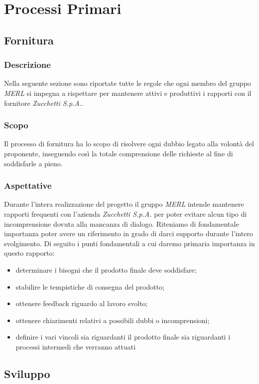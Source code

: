 \chapter{Processi Primari}

\section{Fornitura}
\subsection{Descrizione}
Nella seguente sezione sono riportate tutte le regole che ogni membro del gruppo \textit{MERL} si impegna a rispettare per mantenere attivi e produttivi i rapporti con il fornitore \textit{Zucchetti S.p.A.}.

\subsection{Scopo}
Il processo di fornitura ha lo scopo di risolvere ogni dubbio legato alla volontà del proponente, inseguendo così la totale comprensione delle richieste al fine di soddisfarle a pieno.

\subsection{Aspettative}
Durante l'intera realizzazione del progetto il gruppo \textit{MERL} intende mantenere rapporti frequenti con l'azienda \textit{Zucchetti S.p.A.} per poter evitare alcun tipo di incomprensione dovuta alla mancanza di dialogo. Riteniamo di fondamentale importanza poter avere un riferimento in grado di darci supporto durante l'intero svolgimento. Di seguito i punti fondamentali a cui daremo primaria importanza in questo rapporto:
\begin{itemize}
  \item determinare i bisogni che il prodotto finale deve soddisfare;
  \item stabilire le tempistiche di consegna del prodotto;
  \item ottenere feedback riguardo al lavoro svolto;
  \item ottenere chiarimenti relativi a possibili dubbi o incomprensioni;
  \item definire i vari vincoli sia riguardanti il prodotto finale sia riguardanti i processi intermedi che verranno attuati
\end{itemize}

\section{Sviluppo}
